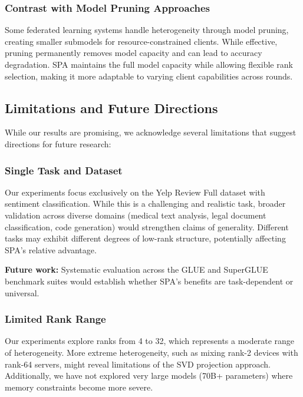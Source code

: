 \documentclass[conference]{IEEEtran}
\begin{document}
\subsubsection{Contrast with Model Pruning Approaches}

Some federated learning systems handle heterogeneity through model pruning, creating smaller submodels for resource-constrained clients. While effective, pruning permanently removes model capacity and can lead to accuracy degradation. SPA maintains the full model capacity while allowing flexible rank selection, making it more adaptable to varying client capabilities across rounds.

\subsection{Limitations and Future Directions}

While our results are promising, we acknowledge several limitations that suggest directions for future research:

\subsubsection{Single Task and Dataset}

Our experiments focus exclusively on the Yelp Review Full dataset with sentiment classification. While this is a challenging and realistic task, broader validation across diverse domains (medical text analysis, legal document classification, code generation) would strengthen claims of generality. Different tasks may exhibit different degrees of low-rank structure, potentially affecting SPA's relative advantage.

\textbf{Future work:} Systematic evaluation across the GLUE and SuperGLUE benchmark suites would establish whether SPA's benefits are task-dependent or universal.

\subsubsection{Limited Rank Range}

Our experiments explore ranks from 4 to 32, which represents a moderate range of heterogeneity. More extreme heterogeneity, such as mixing rank-2 devices with rank-64 servers, might reveal limitations of the SVD projection approach. Additionally, we have not explored very large models (70B+ parameters) where memory constraints become more severe.
\end{document}
